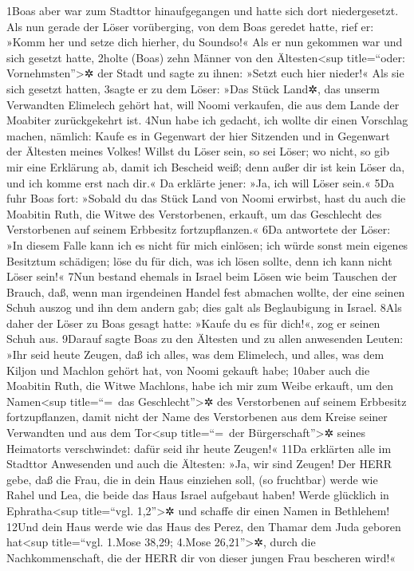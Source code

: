 1Boas aber war zum Stadttor hinaufgegangen und hatte sich dort
niedergesetzt. Als nun gerade der Löser vorüberging, von dem Boas
geredet hatte, rief er: »Komm her und setze dich hierher, du Soundso!«
Als er nun gekommen war und sich gesetzt hatte, 2holte (Boas) zehn
Männer von den Ältesten\textless sup title=``oder:
Vornehmsten''\textgreater✲ der Stadt und sagte zu ihnen: »Setzt euch
hier nieder!« Als sie sich gesetzt hatten, 3sagte er zu dem Löser: »Das
Stück Land✲, das unserm Verwandten Elimelech gehört hat, will Noomi
verkaufen, die aus dem Lande der Moabiter zurückgekehrt ist. 4Nun habe
ich gedacht, ich wollte dir einen Vorschlag machen, nämlich: Kaufe es in
Gegenwart der hier Sitzenden und in Gegenwart der Ältesten meines
Volkes! Willst du Löser sein, so sei Löser; wo nicht, so gib mir eine
Erklärung ab, damit ich Bescheid weiß; denn außer dir ist kein Löser da,
und ich komme erst nach dir.« Da erklärte jener: »Ja, ich will Löser
sein.« 5Da fuhr Boas fort: »Sobald du das Stück Land von Noomi erwirbst,
hast du auch die Moabitin Ruth, die Witwe des Verstorbenen, erkauft, um
das Geschlecht des Verstorbenen auf seinem Erbbesitz fortzupflanzen.«
6Da antwortete der Löser: »In diesem Falle kann ich es nicht für mich
einlösen; ich würde sonst mein eigenes Besitztum schädigen; löse du für
dich, was ich lösen sollte, denn ich kann nicht Löser sein!« 7Nun
bestand ehemals in Israel beim Lösen wie beim Tauschen der Brauch, daß,
wenn man irgendeinen Handel fest abmachen wollte, der eine seinen Schuh
auszog und ihn dem andern gab; dies galt als Beglaubigung in Israel.
8Als daher der Löser zu Boas gesagt hatte: »Kaufe du es für dich!«, zog
er seinen Schuh aus. 9Darauf sagte Boas zu den Ältesten und zu allen
anwesenden Leuten: »Ihr seid heute Zeugen, daß ich alles, was dem
Elimelech, und alles, was dem Kiljon und Machlon gehört hat, von Noomi
gekauft habe; 10aber auch die Moabitin Ruth, die Witwe Machlons, habe
ich mir zum Weibe erkauft, um den Namen\textless sup title=``=~das
Geschlecht''\textgreater✲ des Verstorbenen auf seinem Erbbesitz
fortzupflanzen, damit nicht der Name des Verstorbenen aus dem Kreise
seiner Verwandten und aus dem Tor\textless sup title=``=~der
Bürgerschaft''\textgreater✲ seines Heimatorts verschwindet: dafür seid
ihr heute Zeugen!« 11Da erklärten alle im Stadttor Anwesenden und auch
die Ältesten: »Ja, wir sind Zeugen! Der HERR gebe, daß die Frau, die in
dein Haus einziehen soll, (so fruchtbar) werde wie Rahel und Lea, die
beide das Haus Israel aufgebaut haben! Werde glücklich in
Ephratha\textless sup title=``vgl. 1,2''\textgreater✲ und schaffe dir
einen Namen in Bethlehem! 12Und dein Haus werde wie das Haus des Perez,
den Thamar dem Juda geboren hat\textless sup title=``vgl. 1.Mose 38,29;
4.Mose 26,21''\textgreater✲, durch die Nachkommenschaft, die der HERR
dir von dieser jungen Frau bescheren wird!«

